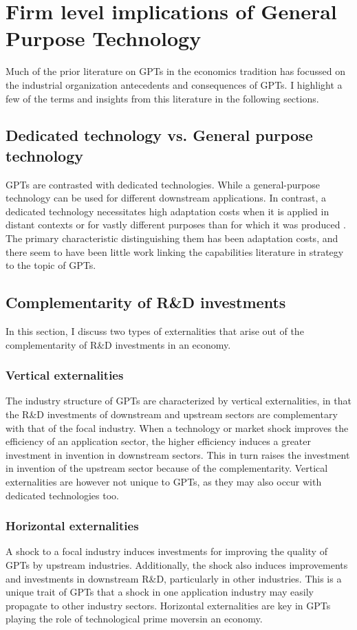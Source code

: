 \documentclass[12pt,letterpaper]{article}
\begin{document}
\section{Firm level implications of General Purpose Technology}
Much of the prior literature on GPTs in the economics tradition has focussed on the industrial organization antecedents and consequences of GPTs. I highlight a few of the terms and insights from this literature in the following sections.

\subsection{Dedicated technology vs. General purpose technology}
GPTs are contrasted with dedicated technologies. While a general-purpose technology can be used for different downstream applications. In contrast, a dedicated technology necessitates high adaptation costs when it is applied in distant contexts or for vastly different purposes than for which it was produced \citep{Rosenberg2004}. The primary characteristic distinguishing them has been adaptation costs, and there seem to have been little work linking the capabilities literature in strategy to the topic of GPTs.

\subsection{Complementarity of R\&D investments}
In this section, I discuss two types of externalities that arise out of the complementarity of R\&D investments in an economy.
\subsubsection{Vertical externalities}
The industry structure of GPTs are characterized by vertical externalities, in that the R\&D investments of downstream and upstream sectors are complementary with that of the focal industry. When a technology or market shock improves the efficiency of an
application sector, the higher efficiency induces a greater investment in invention in downstream sectors. This in turn raises the investment in invention of the upstream sector because of the complementarity. Vertical externalities are however not unique to GPTs, as they may also occur with dedicated technologies too.

\subsubsection{Horizontal externalities}
A shock to a focal industry induces investments for improving the quality of GPTs by upstream industries. Additionally, the shock also induces improvements and investments in downstream R\&D, particularly in other industries. This is a unique trait of GPTs that a shock in one application industry may easily propagate to other industry sectors. Horizontal externalities are key in GPTs playing the role of \textquotesingle technological prime movers\textquotesingle in an economy.
\end{document}

